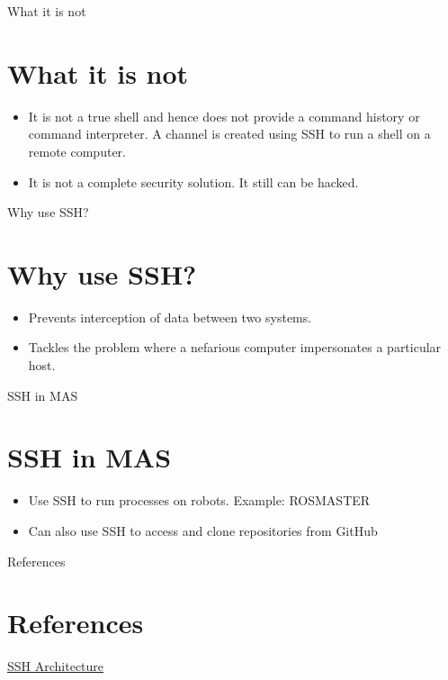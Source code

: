 \documentclass{beamer}
\begin{document}
\begin{frame}{What it is not}
\section{What it is not}
\begin{itemize}
\item {
It is not a true shell and hence does not provide a command history or command interpreter. A channel is created using SSH to run a shell on a remote computer.
}
\item {   
It is not a complete security solution. It still can be hacked.
}
\end{itemize}
\end{frame}

\begin{frame}{Why use SSH?}{}
\section{Why use SSH?}
\begin{itemize}
\item {
	Prevents interception of data between two systems.
}
\item {Tackles the problem where a nefarious computer impersonates a particular host.}
\end{itemize}
\end{frame}	

\begin{frame}{SSH in MAS}
\section{SSH in MAS}
\begin{itemize} 
	\item Use SSH to run processes on robots. Example: ROSMASTER
	\item Can also use SSH to access and clone repositories from GitHub
\end{itemize}
\end{frame}	


\begin{frame}{References}
\section{References}

\begin{thebibliography}{10}


\href{https://docstore.mik.ua/orelly/networking_2ndEd/ssh/ch01_01.htm}{SSH Architecture}




\end{thebibliography}
\end{frame}
\end{document}
